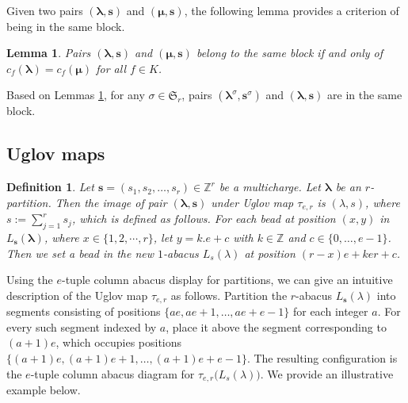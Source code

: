 \documentclass[a4paper,10pt]{amsart}
\theoremstyle{plain}
\newcommand{\lam}{\lambda}
\def\bs{{\boldsymbol{s}}}
\def\Z{{\mathbb Z}}
\def\blam{{\boldsymbol \lambda}}
\def\bmu{{\boldsymbol \mu}}
\theoremstyle{plain}
\newtheorem{lemma}[theorem]{Lemma}
\newtheorem{definition}[theorem]{Definition}
\numberwithin{equation}{section}
\begin{document}
Given two pairs $(\blam, \bs)$ and $(\bmu, \bs)$, the following lemma provides a criterion of being in the same block.

\begin{lemma}\label{residueblock}
Pairs $(\blam, \bs)$ and $(\bmu, \bs)$ belong to the same block if and only of $c_f(\blam)=c_f(\bmu)$ for all $f\in K$.
\end{lemma}



Based on Lemmas \ref{residueblock}, for any $\sigma\in \mathfrak{S}_r$, pairs $(\blam^\sigma, \bs^{\sigma})$ and $(\blam, \bs)$ are in the same block.

\smallskip
\subsection{Uglov maps}

\begin{definition}\label{Uglovmap}
Let $\bs=(s_1, s_2, \dots, s_r)\in \mathbb{Z}^r$ be a multicharge. Let $\blam$ be an $r$-partition. Then the image of pair $(\blam, \bs)$ under Uglov map $\tau_{e, r}$ is $(\lam, s)$, where $s:=\sum_{j=1}^r s_j$,
which is defined as follows. For each bead at position $(x, y)$ in $L_\bs(\blam)$, where $x\in\{1,2,\cdots,r\}$, let $y = k.e + c$ with $k \in \Z$ and $c \in \{0, \dots, e-1\}$. Then we set a bead in the new $1$-abacus $L_s(\lam)$ at position $(r-x)e+ker +c$.
\end{definition}

Using the $e$-tuple column abacus display for partitions, we can give an intuitive description of the Uglov map $\tau_{e, r}$ as follows. Partition the $r$-abacus \(L_\bs(\lambda)\) into segments consisting of positions \(\{ae, ae+1, \dots, ae+e-1\}\) for each integer $a$. For every such segment indexed by $a$, place it above the segment corresponding to \((a+1)e\), which occupies positions \(\{(a+1)e, (a+1)e+1, \dots, (a+1)e+e-1\}\). The resulting configuration is the $e$-tuple column abacus diagram for \(\tau_{e,r}\big(L_s(\lambda)\bigr)\). We provide an illustrative example below.
\end{document}
